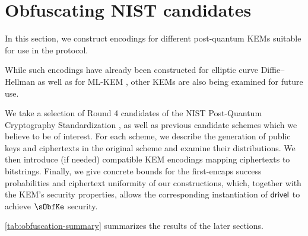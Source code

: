 \chapter{Obfuscating NIST candidates}\label{ch:obfuscation}

In this section, we construct encodings for different post-quantum KEMs suitable for use in the \drivel protocol.

While such encodings have already been constructed for elliptic curve Diffie–Hellman \cite{EC:vAhHop04,tor-dev-udh,USENIX:WWGH11,CCS:BHKL13,FC:Tibouchi14} as well as for ML-KEM \cite{CCS:GunSteVei24}, other KEMs are also being examined for future use.

We take a selection of Round 4 candidates of the NIST Post-Quantum Cryptography Standardization \cite{nist-standardization}, as well as previous candidate schemes which we believe to be of interest.
For each scheme, we describe the generation of public keys and ciphertexts in the original scheme and examine their distributions. We then introduce (if needed) compatible KEM encodings mapping ciphertexts to bitstrings. Finally, we give concrete bounds for the first-encaps success probabilities and ciphertext uniformity of our constructions, which, together with the KEM's security properties, allows the corresponding instantiation of $\textsf{drivel}$ to achieve $\sObfKe$ security.

\cref{tab:obfuscation-summary} summarizes the results of the later sections.

